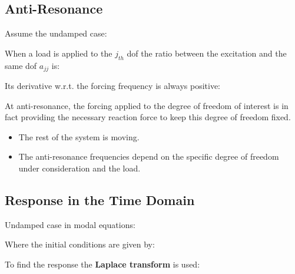 \documentclass[10pt,a4paper]{scrartcl}
\begin{document}
\begin{multicols*}{2}
\subsection{Anti-Resonance}

Assume the undamped case:


When a load is applied to the $j_{th}$ dof the ratio between the excitation and the same dof $a_{jj}$ is:


Its derivative w.r.t. the forcing frequency is always positive:


At anti-resonance, the forcing applied to the degree of freedom of interest is in fact providing the necessary reaction force to keep this degree of freedom fixed.

\begin{itemize}
\item The rest of the system is moving.
\item The anti-resonance frequencies depend on the specific degree of freedom under consideration and the load.
\end{itemize}

\subsection{Response in the Time Domain}

Undamped case in modal equations:


Where the initial conditions are given by:


To find the response the \textbf{Laplace transform} is used:



\end{multicols*}
\end{document}
